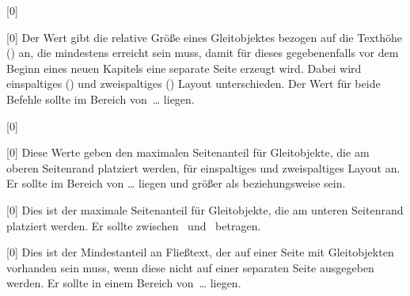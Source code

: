 \begin{Declaration}{}[0\floatpagefraction]
\begin{Declaration}{}[0\dblfloatpagefraction]
\printdeclarationlist%
%
Der Wert gibt die relative Größe eines Gleitobjektes bezogen auf die Texthöhe 
() an, die mindestens erreicht sein muss, damit für dieses 
gegebenenfalls vor dem Beginn eines neuen Kapitels eine separate Seite erzeugt 
wird. Dabei wird einspaltiges () und zweispaltiges 
() Layout unterschieden. Der Wert für beide 
Befehle sollte im Bereich von~\dots{} liegen.
\end{Declaration}
\end{Declaration}

\begin{Declaration}{}[0\topfraction]
\begin{Declaration}{}[0\dbltopfraction]
\printdeclarationlist%
%
Diese Werte geben den maximalen Seitenanteil für Gleitobjekte, die am oberen 
Seitenrand platziert werden, für einspaltiges und zweispaltiges Layout an. Er 
sollte im Bereich von \dots{} liegen und größer als 
 beziehungsweise  sein.
\end{Declaration}
\end{Declaration}

\begin{Declaration}{}[0\bottomfraction]
\printdeclarationlist%
%
Dies ist der maximale Seitenanteil für Gleitobjekte, die am unteren Seitenrand 
platziert werden. Er sollte zwischen~ und~ betragen.
\end{Declaration}

\begin{Declaration}{}[0\textfraction]
\printdeclarationlist%
%
Dies ist der Mindestanteil an Fließtext, der auf einer Seite mit Gleitobjekten 
vorhanden sein muss, wenn diese nicht auf einer separaten Seite ausgegeben 
werden. Er sollte in einem Bereich von~\dots{} liegen.
\end{Declaration}

